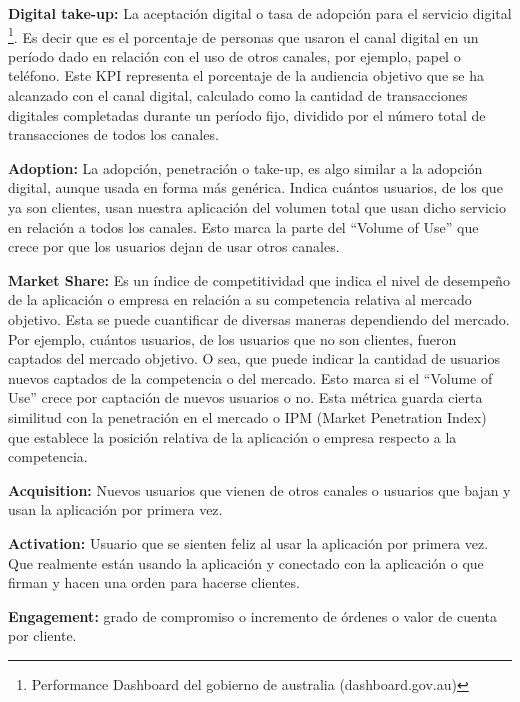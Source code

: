 \begin{description}
  \item {\textbf{Digital take-up:} La aceptación digital o tasa de adopción para el servicio digital \footnote{Performance Dashboard del gobierno de australia (dashboard.gov.au)}. Es decir que es el porcentaje de personas que usaron el canal digital en un período dado en relación con el uso de otros canales, por ejemplo, papel o teléfono. Este KPI representa el porcentaje de la audiencia objetivo que se ha alcanzado con el canal digital, calculado como la cantidad de transacciones digitales completadas durante un período fijo, dividido por el número total de transacciones de todos los canales.
}

  \item {\textbf{Adoption:} La adopción, penetración o take-up, es algo similar a la adopción digital, aunque usada en forma más genérica. Indica cuántos usuarios, de los que ya son clientes, usan nuestra aplicación del volumen total que usan dicho servicio en relación a todos los canales. Esto marca la parte del “Volume of Use” que crece por que los usuarios dejan de usar otros canales.
}

  \item {\textbf{Market Share:} Es un índice de competitividad que indica el nivel de desempeño de la aplicación o empresa en relación a su competencia relativa al mercado objetivo. Esta se puede cuantificar de diversas maneras dependiendo del mercado. Por ejemplo, cuántos usuarios, de los usuarios que no son clientes, fueron captados del mercado objetivo. O sea, que puede indicar la cantidad de usuarios nuevos captados de la competencia o del mercado. Esto marca si el “Volume of Use” crece por captación de nuevos usuarios o no. Esta métrica guarda cierta similitud con la penetración en el mercado o IPM (Market Penetration Index) que establece la posición relativa de la aplicación o empresa respecto a la competencia.
}

  \item {\textbf{Acquisition:} Nuevos usuarios que vienen de otros canales o usuarios que bajan y usan la aplicación por primera vez.
}

  \item {\textbf{Activation:} Usuario que se sienten feliz al usar la aplicación por primera vez. Que realmente están usando la aplicación y conectado con la aplicación o que firman y hacen una orden para hacerse clientes.
}

  \item {\textbf{Engagement:} grado de compromiso o incremento de órdenes o valor de cuenta por cliente.
}


\end{description}
